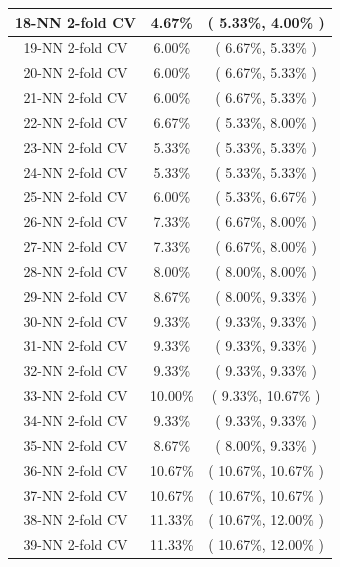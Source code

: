 \documentclass[11pt,a4paper]{article}
\begin{document}
\begin{center}
\begin{tabular} {|| c | c | c ||}
        18-NN 2-fold CV & 4.67\% & ( 5.33\%, 4.00\% )\\ \hline
        19-NN 2-fold CV & 6.00\% & ( 6.67\%, 5.33\% )\\ \hline
        20-NN 2-fold CV & 6.00\% & ( 6.67\%, 5.33\% )\\ \hline
        21-NN 2-fold CV & 6.00\% & ( 6.67\%, 5.33\% )\\ \hline
        22-NN 2-fold CV & 6.67\% & ( 5.33\%, 8.00\% )\\ \hline
        23-NN 2-fold CV & 5.33\% & ( 5.33\%, 5.33\% )\\ \hline
        24-NN 2-fold CV & 5.33\% & ( 5.33\%, 5.33\% )\\ \hline
        25-NN 2-fold CV & 6.00\% & ( 5.33\%, 6.67\% )\\ \hline
        26-NN 2-fold CV & 7.33\% & ( 6.67\%, 8.00\% )\\ \hline
        27-NN 2-fold CV & 7.33\% & ( 6.67\%, 8.00\% )\\ \hline
        28-NN 2-fold CV & 8.00\% & ( 8.00\%, 8.00\% )\\ \hline
        29-NN 2-fold CV & 8.67\% & ( 8.00\%, 9.33\% )\\ \hline
        30-NN 2-fold CV & 9.33\% & ( 9.33\%, 9.33\% )\\ \hline
        31-NN 2-fold CV & 9.33\% & ( 9.33\%, 9.33\% )\\ \hline
        32-NN 2-fold CV & 9.33\% & ( 9.33\%, 9.33\% )\\ \hline
        33-NN 2-fold CV & 10.00\% & ( 9.33\%, 10.67\% )\\ \hline
        34-NN 2-fold CV & 9.33\% & ( 9.33\%, 9.33\% )\\ \hline
        35-NN 2-fold CV & 8.67\% & ( 8.00\%, 9.33\% )\\ \hline
        36-NN 2-fold CV & 10.67\% & ( 10.67\%, 10.67\% )\\ \hline
        37-NN 2-fold CV & 10.67\% & ( 10.67\%, 10.67\% )\\ \hline
        38-NN 2-fold CV & 11.33\% & ( 10.67\%, 12.00\% )\\ \hline
        39-NN 2-fold CV & 11.33\% & ( 10.67\%, 12.00\% )\\ \hline
\end{tabular}
\end{center}
\newpage

\hypertarget{fiveFoldResultunNorm}{}
\end{document}
